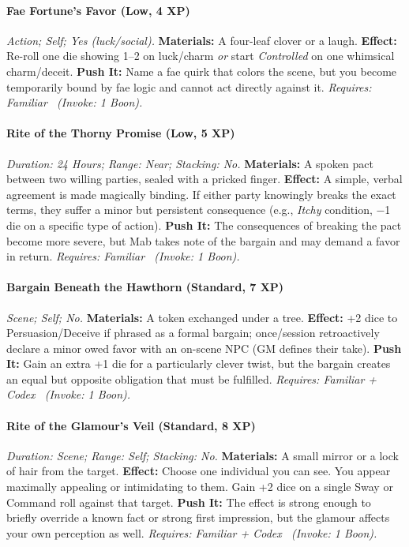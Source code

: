 \documentclass[12pt,twoside]{book}
\begin{document}
\paragraph{Fae Fortune's Favor (Low, 4 XP)} \emph{Action; Self; Yes (luck/social).}
\textbf{Materials:} A four-leaf clover or a laugh.
\textbf{Effect:} Re-roll one die showing 1–2 on luck/charm \emph{or} start \emph{Controlled} on one whimsical charm/deceit.
\textbf{Push It:} Name a fae quirk that colors the scene, but you become temporarily bound by fae logic and cannot act directly against it.
\emph{Requires: Familiar \ (\textit{Invoke:} 1 Boon).}
\paragraph{Rite of the Thorny Promise (Low, 5 XP)} \emph{Duration: 24 Hours; Range: Near; Stacking: No.}
\textbf{Materials:} A spoken pact between two willing parties, sealed with a pricked finger.
\textbf{Effect:} A simple, verbal agreement is made magically binding. If either party knowingly breaks the exact terms, they suffer a minor but persistent consequence (e.g., \emph{Itchy} condition, −1 die on a specific type of action).
\textbf{Push It:} The consequences of breaking the pact become more severe, but Mab takes note of the bargain and may demand a favor in return.
\emph{Requires: Familiar \ (\textit{Invoke:} 1 Boon).}
\paragraph{Bargain Beneath the Hawthorn (Standard, 7 XP)} \emph{Scene; Self; No.}
\textbf{Materials:} A token exchanged under a tree.
\textbf{Effect:} +2 dice to Persuasion/Deceive if phrased as a formal bargain; once/session retroactively declare a minor owed favor with an on-scene NPC (GM defines their take).
\textbf{Push It:} Gain an extra +1 die for a particularly clever twist, but the bargain creates an equal but opposite obligation that must be fulfilled.
\emph{Requires: Familiar + Codex \ (\textit{Invoke:} 1 Boon).}
\paragraph{Rite of the Glamour's Veil (Standard, 8 XP)} \emph{Duration: Scene; Range: Self; Stacking: No.}
\textbf{Materials:} A small mirror or a lock of hair from the target.
\textbf{Effect:} Choose one individual you can see. You appear maximally appealing or intimidating to them. Gain +2 dice on a single Sway or Command roll against that target.
\textbf{Push It:} The effect is strong enough to briefly override a known fact or strong first impression, but the glamour affects your own perception as well.
\emph{Requires: Familiar + Codex \ (\textit{Invoke:} 1 Boon).}
\end{document}

